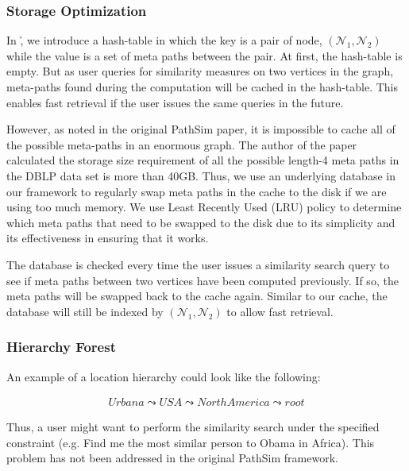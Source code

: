 
\subsubsection{Storage Optimization}

In \h, we introduce a hash-table in which the key is a pair of node,
$(\mathcal{N}_1, \mathcal{N}_2)$ while the value is a set of meta paths between
the pair.  At first, the hash-table is empty. But as user queries for
similarity measures on two vertices in the graph, meta-paths found during the
computation will be cached in the hash-table. This enables fast retrieval if
the user issues the same queries in the future.

However, as noted in the original PathSim paper, it is impossible to cache all
of the possible meta-paths in an enormous graph. The author of the paper
calculated the storage size requirement of all the possible length-4 meta paths
in the DBLP data set is more than 40GB. Thus, we use an underlying database in
our framework to regularly swap meta paths in the cache to the disk if we are
using too much memory. We use Least Recently Used (LRU) policy to determine
which meta paths that need to be swapped to the disk due to its simplicity and
its effectiveness in ensuring that it works.

The database is checked every time the user issues a similarity search query to
see if meta paths between two vertices have been computed previously. If so, the
meta paths will be swapped back to the cache again. Similar to our cache, the
database will still be indexed by $(\mathcal{N}_1, \mathcal{N}_2)$ to allow
fast retrieval.

\subsubsection{Hierarchy Forest}
\label{sec:hier_forest}

 An example of a location hierarchy could look like
the following:

\begin{align*}
Urbana \leadsto USA \leadsto North America \leadsto root
\end{align*}

Thus, a user might want to perform the similarity search under the specified
constraint (e.g. Find me the most similar person to Obama in Africa). This
problem has not been addressed in the original PathSim framework.

